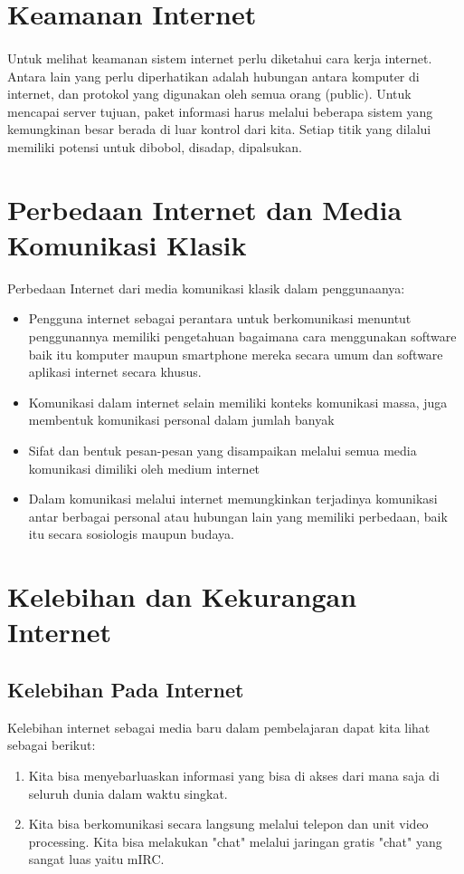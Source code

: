 \documentclass[12pt, a4paper]{article}
\begin{document}
\section{Keamanan Internet}
\paragraph{} Untuk melihat keamanan sistem internet perlu diketahui cara kerja internet. Antara lain yang perlu diperhatikan adalah hubungan antara komputer di internet, dan protokol yang digunakan oleh semua orang (public). Untuk mencapai server tujuan, paket informasi harus melalui beberapa sistem yang kemungkinan besar berada di luar kontrol dari kita. Setiap titik yang dilalui memiliki potensi untuk dibobol, disadap, dipalsukan.

\section{Perbedaan Internet dan Media Komunikasi Klasik}
Perbedaan Internet dari media komunikasi klasik dalam penggunaanya:
\begin{itemize}
\item Pengguna internet sebagai perantara untuk berkomunikasi menuntut penggunannya memiliki pengetahuan bagaimana cara menggunakan software baik itu komputer maupun smartphone mereka secara umum dan software aplikasi internet secara khusus.
\item Komunikasi dalam internet selain memiliki konteks komunikasi massa, juga membentuk komunikasi personal dalam jumlah banyak
\item Sifat dan bentuk pesan-pesan yang disampaikan melalui semua media komunikasi dimiliki oleh medium internet
\item Dalam komunikasi melalui internet memungkinkan terjadinya komunikasi antar berbagai personal atau hubungan lain yang memiliki perbedaan, baik itu secara sosiologis maupun budaya.
\end{itemize}

\section{Kelebihan dan Kekurangan Internet}
\subsection{Kelebihan Pada Internet}
    Kelebihan internet sebagai media baru dalam pembelajaran dapat kita lihat sebagai berikut:
\begin{enumerate}
\item Kita bisa menyebarluaskan informasi yang bisa di akses dari mana saja di seluruh dunia dalam waktu singkat.
\item Kita bisa berkomunikasi secara langsung melalui telepon dan unit video processing. Kita bisa melakukan "chat" melalui jaringan gratis "chat" yang sangat luas yaitu mIRC.
\end{enumerate}
\end{document}
